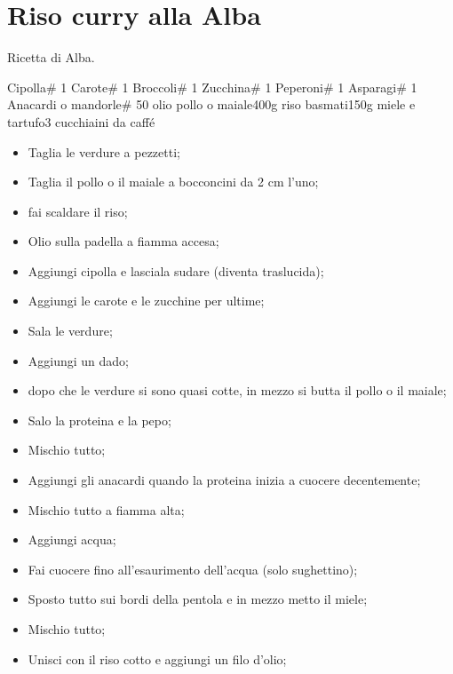 \section{Riso curry alla Alba}

Ricetta di Alba.
\generalRecipeInfos{}

\ingredienti%
    {Cipolla}{\# 1}%
    {Carote}{\# 1}%
    {Broccoli}{\# 1}%
    {Zucchina}{\# 1}%
    {Peperoni}{\# 1}%
    {Asparagi}{\# 1}%
    {Anacardi o mandorle}{\# 50}%
    {olio}{\qb{}}%
    {pollo o maiale}{400g}%
    {riso basmati}{150g}%
    {miele e tartufo}{3 cucchiaini da caffé}%

\begin{itemize}
    \item Taglia le verdure a pezzetti;
    \item Taglia il pollo o il maiale a bocconcini da 2 cm l'uno;
    \item fai scaldare il riso;
    \item Olio sulla padella a fiamma accesa;
    \item Aggiungi cipolla e lasciala sudare (diventa traslucida);
    \item Aggiungi le carote e le zucchine per ultime;
    \item Sala le verdure;
    \item Aggiungi un dado;
    \item dopo che le verdure si sono quasi cotte, in mezzo si butta il pollo o il maiale;
    \item Salo la proteina e la pepo;
    \item Mischio tutto;
    \item Aggiungi gli anacardi quando la proteina inizia a cuocere decentemente;
    \item Mischio tutto a fiamma alta;
    \item Aggiungi acqua;
    \item Fai cuocere fino all'esaurimento dell'acqua (solo sughettino);
    \item Sposto tutto sui bordi della pentola e in mezzo metto il miele;
    \item Mischio tutto;
    \item Unisci con il riso cotto e aggiungi un filo d'olio;
\end{itemize}